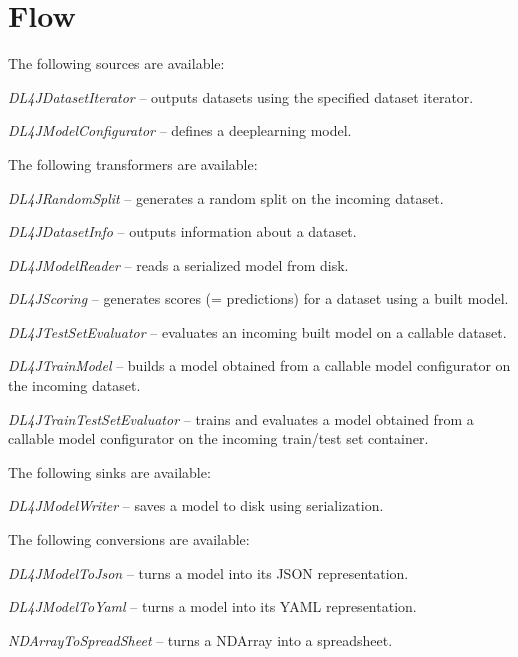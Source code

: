 \documentclass[a4paper]{book}
\begin{document}
\chapter{Flow}

The following sources are available:
\begin{tight_itemize}
  \item \textit{DL4JDatasetIterator} -- outputs datasets using the specified
  dataset iterator.
  \item \textit{DL4JModelConfigurator} -- defines a deeplearning model.
\end{tight_itemize}

The following transformers are available:
\begin{tight_itemize}
  \item \textit{DL4JRandomSplit} -- generates a random split on the incoming dataset.
  \item \textit{DL4JDatasetInfo} -- outputs information about a dataset.
  \item \textit{DL4JModelReader} -- reads a serialized model from disk.
  \item \textit{DL4JScoring} -- generates scores (= predictions) for a dataset
  using a built model.
  \item \textit{DL4JTestSetEvaluator} -- evaluates an incoming built model on a
  callable dataset.
  \item \textit{DL4JTrainModel} -- builds a model obtained from a callable model
  configurator on the incoming dataset.
  \item \textit{DL4JTrainTestSetEvaluator} -- trains and evaluates a model obtained
  from a callable model configurator on the incoming train/test set container.
\end{tight_itemize}

The following sinks are available:
\begin{tight_itemize}
  \item \textit{DL4JModelWriter} -- saves a model to disk using serialization.
\end{tight_itemize}

The following conversions are available:
\begin{tight_itemize}
  \item \textit{DL4JModelToJson} -- turns a model into its JSON\cite{json} representation.
  \item \textit{DL4JModelToYaml} -- turns a model into its YAML\cite{yaml} representation.
  \item \textit{NDArrayToSpreadSheet} -- turns a NDArray into a spreadsheet.
\end{tight_itemize}


\end{document}
